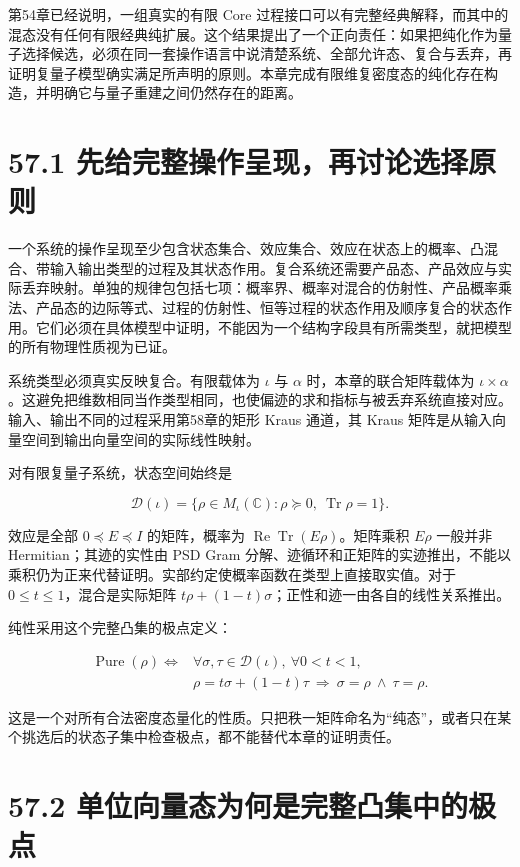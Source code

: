 \documentclass[
  11pt,
  oneside]{book}
\begin{document}
第54章已经说明，一组真实的有限 Core
过程接口可以有完整经典解释，而其中的混态没有任何有限经典纯扩展。这个结果提出了一个正向责任：如果把纯化作为量子选择候选，必须在同一套操作语言中说清楚系统、全部允许态、复合与丢弃，再证明复量子模型确实满足所声明的原则。本章完成有限维复密度态的纯化存在构造，并明确它与量子重建之间仍然存在的距离。

\section{57.1 先给完整操作呈现，再讨论选择原则}

一个系统的操作呈现至少包含状态集合、效应集合、效应在状态上的概率、凸混合、带输入输出类型的过程及其状态作用。复合系统还需要产品态、产品效应与实际丢弃映射。单独的规律包包括七项：概率界、概率对混合的仿射性、产品概率乘法、产品态的边际等式、过程的仿射性、恒等过程的状态作用及顺序复合的状态作用。它们必须在具体模型中证明，不能因为一个结构字段具有所需类型，就把模型的所有物理性质视为已证。

系统类型必须真实反映复合。有限载体为 \(\iota\) 与 \(\alpha\)
时，本章的联合矩阵载体为
\(\iota\times\alpha\)。这避免把维数相同当作类型相同，也使偏迹的求和指标与被丢弃系统直接对应。输入、输出不同的过程采用第58章的矩形
Kraus 通道，其 Kraus 矩阵是从输入向量空间到输出向量空间的实际线性映射。

对有限复量子系统，状态空间始终是

\[
\mathcal D(\iota)=\{\rho\in M_\iota(\mathbb C):\rho\succeq0,\ \operatorname{Tr}\rho=1\}.
\]

效应是全部 \(0\preceq E\preceq I\) 的矩阵，概率为
\(\operatorname{Re}\operatorname{Tr}(E\rho)\)。矩阵乘积 \(E\rho\)
一般并非 Hermitian；其迹的实性由 PSD Gram
分解、迹循环和正矩阵的实迹推出，不能以乘积仍为正来代替证明。实部约定使概率函数在类型上直接取实值。对于
\(0\le t\le1\)，混合是实际矩阵
\(t\rho+(1-t)\sigma\)；正性和迹一由各自的线性关系推出。

纯性采用这个完整凸集的极点定义：

\[
\begin{aligned}
\operatorname{Pure}(\rho)\iff{}&
\forall\sigma,\tau\in\mathcal D(\iota),\ \forall 0<t<1,\\
&\rho=t\sigma+(1-t)\tau
\ \Longrightarrow\ \sigma=\rho\ \land\ \tau=\rho.
\end{aligned}
\]

这是一个对所有合法密度态量化的性质。只把秩一矩阵命名为``纯态''，或者只在某个挑选后的状态子集中检查极点，都不能替代本章的证明责任。

\section{57.2 单位向量态为何是完整凸集中的极点}
\end{document}
